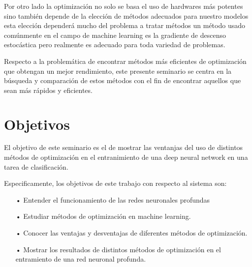 Por otro lado la optimización no solo se basa el uso de hardwares más potentes sino también depende de la elección de métodos adecuados para nuestro modelos esta elección dependerá mucho del problema a tratar métodos un método usado comúnmente en el campo de machine learning es la gradiente de descenso estocástica pero realmente es adecuado para toda variedad de problemas.

Respecto a la problemática de encontrar métodos más eficientes de optimización que obtengan un mejor rendimiento, este presente seminario se centra en la búsqueda y comparación de estos métodos con el fin de encontrar aquellos que sean más rápidos y eficientes.


\section{Objetivos}

El objetivo de este seminario es el de mostrar las ventanjas del uso de distintos métodos de optimización en el entranimiento de una deep neural network en una tarea de clasificación.

Especificamente, los objetivos de este trabajo con respecto al sistema son:

\begin{itemize}
\item[•] Entender el funcionamiento de las redes neuronales profundas%

\item[•] Estudiar métodos de optimización en machine learning.

\item[•] Conocer las ventajas y desventajas de diferentes métodos de optimización.
\item[•] Mostrar los resultados de distintos métodos de optimización en el entramiento de una red neuronal profunda.



\end{itemize}

